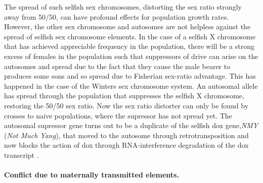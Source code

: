 {The spread of such selfish sex chromosomes, distorting the sex ratio
strongly away from 50/50, can have profound effects for population
growth rates. However, the other sex chromosome and autosomes are not helpless
against the spread of selfish sex chromosome elements. In the case of
a selfish X chromosome that has achieved appreciable frequency in the population, there will be a strong excess of females
in the population such that suppressors of drive can arise on the autosomes
and spread due to the fact that they  cause the male bearer to
produces some sons and so spread due to Fisherian sex-ratio advantage.
This has happened in the case of the Winters sex chromosome system. An
autosomal allele has spread through the population that suppresses the
selfish X chromosome, restoring the 50/50 sex ratio. Now the sex ratio
distorter can only be found by crosses to naive populations, where the
supressor has not spread yet. The autosomal supressor gene turns out to be
a duplicate of the selfish dox gene,{\it NMY} ({\it Not Much Yang}), that moved to the
autosome through retrotransposition and now blocks the action of dox
through RNA-interference degradation of the dox transcript \citep[
][, see Figure \ref{fig:dox_cartoon}]{tao2007sex}.


\paragraph{Conflict due to maternally transmitted elements.}






}
